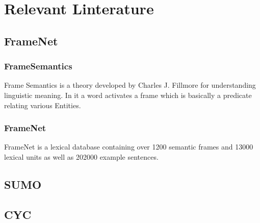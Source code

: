 
\chapter{Relevant Linterature} %

\label{Chapter1} %


\newcommand{\keyword}[1]{\textbf{#1}}
\newcommand{\tabhead}[1]{\textbf{#1}}
\newcommand{\code}[1]{\texttt{#1}}
\newcommand{\file}[1]{\texttt{\bfseries#1}}
\newcommand{\option}[1]{\texttt{\itshape#1}}


\section{FrameNet}

\subsection{FrameSemantics}

Frame Semantics is a theory developed by Charles J. Fillmore for understanding linguistic meaning. In it a word activates a frame which is basically a predicate relating various Entities.

\subsection{FrameNet}

FrameNet is a lexical database containing over 1200 semantic frames and 13000 lexical units as well as 202000 example sentences.

\section{SUMO}



\section{CYC}
